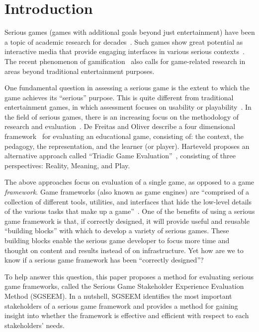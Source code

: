 \documentclass{sigchi}
\begin{document}

\section{Introduction}

Serious games (games with additional goals beyond just entertainment) have been a topic
of academic research for decades~\cite{Zyda2005}. Such games show great potential as
interactive media that provide engaging interfaces in various serious
contexts~\cite{mcgonigal2011reality,reeves2009total}. The recent phenomenon of
gamification~\cite{Deterding2011mt} also calls for game-related research in areas beyond
traditional entertainment purposes.

One fundamental question in assessing a serious game is the extent to which the
game achieves its ``serious'' purpose.  This is quite different from 
traditional entertainment games, in which assessment focuses on usability or
playability~\cite{song2007new}. In the field of serious games, there is an increasing
focus on the methodology of research and evaluation~\cite{Mayer2012233}. De Freitas and
Oliver describe a four dimensional framework~\cite{de2006can} for evaluating an
educational game, consisting of: the context, the pedagogy, the representation, and the
learner (or player). Harteveld proposes an alternative approach called ``Triadic Game
Evaluation''~\cite{harteveld2010triadic}, consisting of three perspectives: Reality,
Meaning, and Play.

The above approaches focus on evaluation of a single game, as opposed to a game {\em
  framework}. Game frameworks (also known as game engines) are ``comprised of a collection
of different tools, utilities, and interfaces that hide the low-level details of the
various tasks that make up a game''~\cite{sherrod2006ultimate}. One of the benefits of
using a serious game framework is that, if correctly designed, it will provide useful and
reusable ``building blocks'' with which to develop a variety of serious games.  These
building blocks enable the serious game developer to focus more time and thought on
content and results instead of on infrastructure.  Yet how are we to know if a serious
game framework has been ``correctly designed''?

To help answer this question, this paper proposes a method for evaluating serious game
frameworks, called the Serious Game Stakeholder Experience Evaluation Method (SGSEEM). In
a nutshell, SGSEEM identifies the most important stakeholders of a serious game framework
and provides a method for gaining insight into whether the framework is effective and
efficient with respect to each stakeholders' needs.
\end{document}
